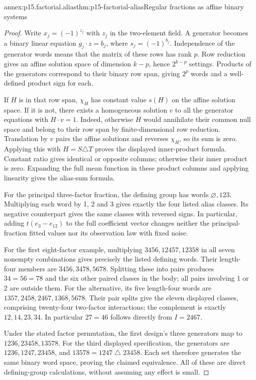 \begin{annexitem}{annex:p15.factorial.alias}{thm:p15-factorial-alias}{Regular fractions as affine binary systems}
\begin{proof}
Write \(x_j=(-1)^{z_j}\) with \(z_j\) in the two-element field.
A generator becomes a binary linear equation
\(g_j\cdot z=b_j\), where \(s_j=(-1)^{b_j}\).
Independence of the generator words means that the matrix of these rows
has rank \(p\). Row reduction gives an affine solution space of
dimension \(k-p\), hence \(2^{k-p}\) settings. Products of the
generators correspond to their binary row span, giving \(2^p\) words
and a well-defined product sign for each.

If \(H\) is in that row span, \(\chi_H\) has constant value \(s(H)\)
on the affine solution space. If it is not, there exists a homogeneous
solution \(v\) to all the generator equations with \(H\cdot v=1\).
Indeed, otherwise \(H\) would annihilate their common null space and
belong to their row span by finite-dimensional row reduction. Translation
by \(v\) pairs the affine solutions and reverses \(\chi_H\), so its
sum is zero. Applying this with \(H=S\triangle T\) proves the displayed
inner-product formula. Constant ratio gives identical or opposite columns;
otherwise their inner product is zero. Expanding the full mean function
in these product columns and applying linearity gives the alias-sum formula.

For the principal three-factor fraction, the defining group has words
\(\varnothing,123\). Multiplying each word by 1, 2 and 3 gives exactly
the four listed alias classes. Its negative counterpart gives the same
classes with reversed signs. In particular, adding
\(t(e_3-e_{12})\) to the full coefficient vector changes neither the
principal-fraction fitted values nor its observation law with fixed noise.

For the first eight-factor example, multiplying
\(3456,12457,12358\) in all seven nonempty combinations gives precisely
the listed defining words. Their length-four members are
\(3456,3478,5678\). Splitting these into pairs produces
\(34=56=78\) and the six other paired classes in the body; all pairs
involving 1 or 2 are outside them. For the alternative, its five
length-four words are \(1357,2458,2467,1368,5678\).
Their pair splits give the eleven displayed classes, comprising
twenty-four two-factor interactions; the complement is exactly
\(12,14,23,34\). In particular \(27=46\) follows directly from
\(I=2467\).

Under the stated factor permutation, the first design's three generators
map to \(1236,23458,13578\). For the third displayed specification,
the generators are \(1236,1247,23458\), and
\(13578=1247\mathbin{\triangle}23458\). Each set therefore generates
the same binary word space, proving the claimed equivalence. All of these
are direct defining-group calculations, without assuming any effect is small.
\end{proof}
\end{annexitem}

